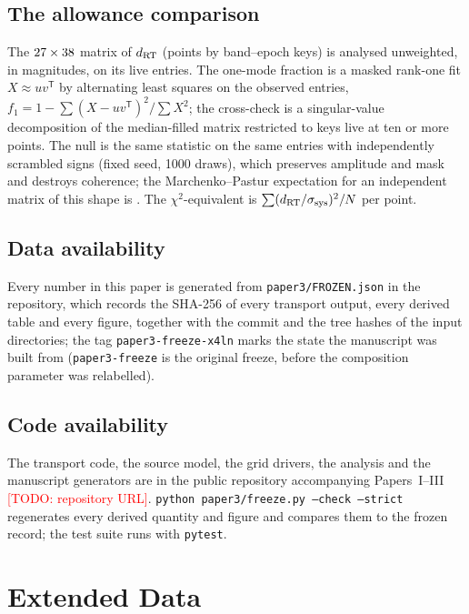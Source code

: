 \documentclass[11pt]{article}
\newcommand{\todo}[1]{\textcolor{red}{[TODO: #1]}}
\newcommand{\dRT}{d_{\rm RT}}
\newcommand{\sigsys}{\sigma_{\rm sys}}
\begin{document}
\subsection*{The allowance comparison}
The $27\times38$ matrix of $\dRT$ (points by band--epoch keys) is analysed unweighted, in magnitudes, on its live entries. The one-mode fraction is a masked rank-one fit $X\approx uv^{\mathsf T}$ by alternating least squares on the observed entries, $f_1=1-\sum(X-uv^{\mathsf T})^2/\sum X^2$; the cross-check is a singular-value decomposition of the median-filled matrix restricted to keys live at ten or more points. The null is the same statistic on the same entries with independently scrambled signs (fixed seed, 1000 draws), which preserves amplitude and mask and destroys coherence; the Marchenko--Pastur expectation for an independent matrix of this shape is \SysMPScale. The $\chi^2$-equivalent is $\sum(\dRT/\sigsys)^2/N$ per point.

\subsection*{Data availability}
Every number in this paper is generated from \texttt{paper3/FROZEN.json} in the repository, which records the SHA-256 of every transport output, every derived table and every figure, together with the commit and the tree hashes of the input directories; the tag \texttt{paper3-freeze-x4ln} marks the state the manuscript was built from (\texttt{paper3-freeze} is the original freeze, before the composition parameter was relabelled).

\subsection*{Code availability}
The transport code, the source model, the grid drivers, the analysis and the manuscript generators are in the public repository accompanying Papers~I--III \todo{repository URL}. \texttt{python paper3/freeze.py --check --strict} regenerates every derived quantity and figure and compares them to the frozen record; the test suite runs with \texttt{pytest}.

\clearpage
\section*{Extended Data}\label{sec:ed}
\setcounter{figure}{0}\renewcommand{\figurename}{Extended Data Fig.}
\setcounter{table}{0}\renewcommand{\tablename}{Extended Data Table}
\end{document}

